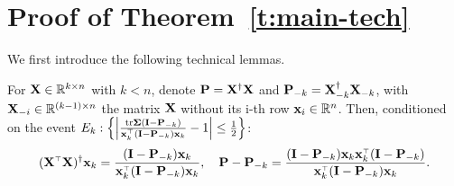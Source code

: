 \documentclass{article}
\begin{document}




% 

\ifisarxiv\else\newpage\fi
\appendix

\section{Proof of Theorem~\ref{t:main-tech}}
\label{sec:proof-of-theo-main-tech}

We first introduce the following technical lemmas.

\begin{lemma}\label{l:rank-one-update}
    For $\mathbf X \in \mathbb R^{k \times n}$ with $k<n$, denote $\mathbf P = \mathbf X^\dagger \mathbf X$ and $\mathbf P_{-k} = \mathbf X_{-k}^\dagger \mathbf X_{-k}$, with $\mathbf X_{-i} \in \mathbb R^{(k-1) \times n}$ the matrix $\mathbf X$ without its i-th row $\mathbf x_i \in \mathbb R^n$. Then, conditioned on the event $E_k: \left\{ \left| \frac{\tr \Sigmab (\I - \P_{-k})}{\x_k^\top (\I - \P_{-k}) \x_k} - 1 \right| \le \frac12 \right\}$:
    \begin{align*}
      (\X^\top\X)^\dagger\x_k = \frac{(\I - \P_{-k}) \x_k}{\x_k^\top (\I - \P_{-k}) \x_k}, \quad \P - \P_{-k} = \frac{(\I - \P_{-k}) \x_k \x_k^\top (\I - \P_{-k}) }{\x_k^\top (\I - \P_{-k}) \x_k}.
    \end{align*}
\end{lemma}
\end{document}
